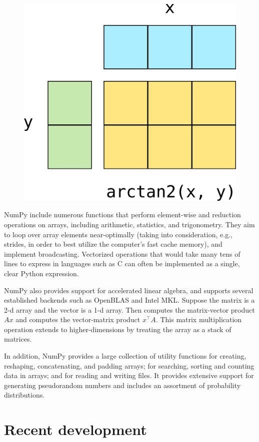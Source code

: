 \begin{figure}
  \centering
  \includegraphics[width=0.5\linewidth]{static/broadcasting}
  \caption{
   }
  \label{fig:broadcasting}
\end{figure}

NumPy include numerous functions that perform element-wise and reduction operations on arrays, including arithmetic, statistics, and trigonometry.  They aim to loop over array elements near-optimally (taking into consideration, e.g., strides, in order to best utilize the computer's fast cache memory), and implement broadcasting.  Vectorized operations that would take many tens of lines to express in languages such as C can often be implemented as a single, clear Python expression.

NumPy also provides support for accelerated linear algebra, and supports several established backends such as OpenBLAS and Intel MKL.  Suppose the matrix  is a 2-d array and the vector  is a 1-d array.  Then  computes the matrix-vector product $Ax$ and
 computes the vector-matrix product $x^\top A$.
This matrix multiplication operation extends to higher-dimensions by
treating the array as a stack of matrices.

In addition, NumPy provides a large collection of utility functions for creating, reshaping, concatenating, and padding arrays; for searching, sorting and counting data in arrays; and for reading and writing files.  It provides extensive support for generating pseudorandom numbers and includes an assortment of probability distributions.


\section*{Recent development}

